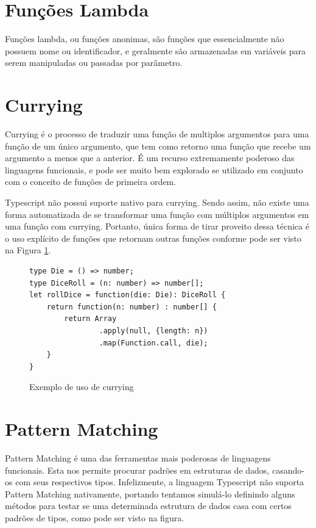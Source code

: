 \documentclass[rel_mlp]{iiufrgs}
\numberwithin{figure}{chapter}
\begin{document}
\section{Funções Lambda}

Funções lambda, ou funções anonimas, são funções que essencialmente não possuem nome ou identificador, e geralmente são armazenadas em variáveis para serem manipuladas ou passadas por parâmetro.


\section{Currying}

Currying é o processo de traduzir uma função de multiplos argumentos para uma função de um único argumento, que tem como retorno uma função que recebe um argumento a menos que a anterior. É um recurso extremamente poderoso das linguagens funcionais, e pode ser muito bem explorado se utilizado em conjunto com o conceito de funções de primeira ordem.

Typescript não possui suporte nativo para currying. Sendo assim, não existe uma forma automatizada de se transformar uma função com múltiplos argumentos em uma função com currying. Portanto, única forma de tirar proveito dessa técnica é o uso explícito de funções que retornam outras funções conforme pode ser visto na Figura \ref{fig:currying}.

\begin{figure}[h]
\begin{verbatim}
type Die = () => number;
type DiceRoll = (n: number) => number[];
let rollDice = function(die: Die): DiceRoll {
    return function(n: number) : number[] {
        return Array
        		.apply(null, {length: n})
        		.map(Function.call, die);
    }
}
\end{verbatim}
\caption{Exemplo de uso de currying}
\label{fig:currying}
\end{figure}

\section{Pattern Matching}

Pattern Matching é uma das ferramentas mais poderosas de linguagens funcionais. Esta nos permite procurar padrões em estruturas de dados, casando-os com seus respectivos tipos. Infelizmente, a linguagem Typescript não suporta Pattern Matching nativamente, portando tentamos simulá-lo definindo alguns métodos para testar se uma determinada estrutura de dados casa com certos padrões de tipos, como pode ser visto na figura.
\end{document}
